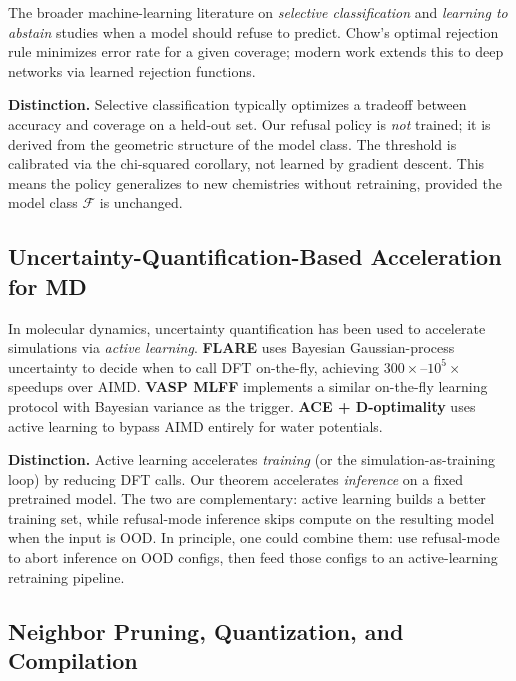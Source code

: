 \documentclass[11pt,a4paper]{article}
\begin{document}
The broader machine-learning literature on \emph{selective classification}\cite{geifman2017selective} and \emph{learning to abstain}\cite{cortes2016learning} studies when a model should refuse to predict. Chow's optimal rejection rule\cite{chow1970optimum} minimizes error rate for a given coverage; modern work extends this to deep networks via learned rejection functions\cite{geifman2019selectivenet}.

\textbf{Distinction.} Selective classification typically optimizes a tradeoff between accuracy and coverage on a held-out set. Our refusal policy is \emph{not} trained; it is derived from the geometric structure of the model class. The threshold is calibrated via the chi-squared corollary, not learned by gradient descent. This means the policy generalizes to new chemistries without retraining, provided the model class $\mathcal{F}$ is unchanged.

\subsection{Uncertainty-Quantification-Based Acceleration for MD}

In molecular dynamics, uncertainty quantification has been used to accelerate simulations via \emph{active learning}. \textbf{FLARE}\cite{vandermause2020flare} uses Bayesian Gaussian-process uncertainty to decide when to call DFT on-the-fly, achieving $300\times$--$10^5\times$ speedups over AIMD. \textbf{VASP MLFF}\cite{jinnouchi2019vasp} implements a similar on-the-fly learning protocol with Bayesian variance as the trigger. \textbf{ACE + D-optimality}\cite{ace2024water} uses active learning to bypass AIMD entirely for water potentials.

\textbf{Distinction.} Active learning accelerates \emph{training} (or the simulation-as-training loop) by reducing DFT calls. Our theorem accelerates \emph{inference} on a fixed pretrained model. The two are complementary: active learning builds a better training set, while refusal-mode inference skips compute on the resulting model when the input is OOD. In principle, one could combine them: use refusal-mode to abort inference on OOD configs, then feed those configs to an active-learning retraining pipeline.

\subsection{Neighbor Pruning, Quantization, and Compilation}
\end{document}
